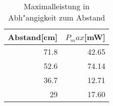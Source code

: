 \begin{table}[h]	
\centering
\begin{tabular}{|r||r|} \hline
Abstand[cm]	&	$P_max$[mW]\\ \hline
71.8	&	42.65\\
52.6	&	74.14\\
36.7	&	12.71\\
29	&	17.60
\end{tabular}
\caption{Maximalleistung in Abh"angigkeit zum Abstand}
\label{tabelle_max}
\end{table}